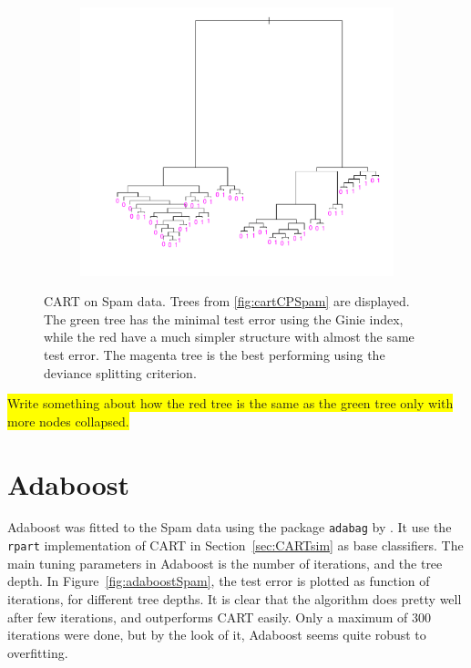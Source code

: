 \begin{figure}[h!tp]
  \begin{subfigure}[b]{0.48\textwidth}
    \includegraphics[width=\textwidth]{./figures/cartOptDevianceSpam.pdf}
  \end{subfigure}
  \vspace{1\baselineskip}
  \caption{CART on Spam data. Trees from \ref{fig:cartCPSpam} are displayed. The green tree has the minimal test error using the Ginie index, while the red have a much simpler structure with almost the same test error. The magenta tree is the best performing using the deviance splitting criterion.}
  \label{fig:CartSpam}
\end{figure}
\colorbox{yellow}{Write something about how the red tree is the same as the green tree only with more nodes collapsed.}\\




\section{Adaboost}
\label{sec:SimAdaBoost}
Adaboost was fitted to the Spam data using the package \verb+adabag+ by \cite{adabag}. It use the \verb+rpart+ implementation of CART in Section~\ref{sec:CARTsim} as base classifiers. The main tuning parameters in Adaboost is the number of iterations, and the tree depth. In Figure~\ref{fig:adaboostSpam}, the test error is plotted as function of iterations, for different tree depths. It is clear that the algorithm does pretty well after few iterations, and outperforms CART easily. Only a maximum of 300 iterations were done, but by the look of it, Adaboost seems quite robust to overfitting. 

